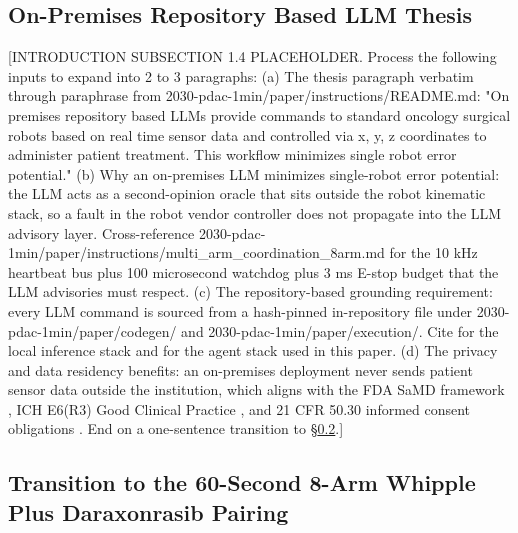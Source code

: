 \subsection{On-Premises Repository Based LLM Thesis}
\label{sec:intro-thesis}

[INTRODUCTION SUBSECTION 1.4 PLACEHOLDER. Process the following inputs to expand into 2 to 3 paragraphs:
(a) The thesis paragraph verbatim through paraphrase from 2030-pdac-1min/paper/instructions/README.md: "On premises repository based LLMs provide commands to standard oncology surgical robots based on real time sensor data and controlled via x, y, z coordinates to administer patient treatment. This workflow minimizes single robot error potential."
(b) Why an on-premises LLM minimizes single-robot error potential: the LLM acts as a second-opinion oracle that sits outside the robot kinematic stack, so a fault in the robot vendor controller does not propagate into the LLM advisory layer. Cross-reference 2030-pdac-1min/paper/instructions/multi_arm_coordination_8arm.md for the 10 kHz heartbeat bus plus 100 microsecond watchdog plus 3 ms E-stop budget that the LLM advisories must respect.
(c) The repository-based grounding requirement: every LLM command is sourced from a hash-pinned in-repository file under 2030-pdac-1min/paper/codegen/ and 2030-pdac-1min/paper/execution/. Cite \cite{ollama, vllm} for the local inference stack and \cite{claude-code, claude-opus-47, claude-sonnet-46} for the agent stack used in this paper.
(d) The privacy and data residency benefits: an on-premises deployment never sends patient sensor data outside the institution, which aligns with the FDA SaMD framework \cite{fda-samd}, ICH E6(R3) Good Clinical Practice \cite{ich-e6r3}, and 21 CFR 50.30 informed consent obligations \cite{cfr-21-50-30}.
End on a one-sentence transition to \S \ref{sec:intro-transition}.]

\subsection{Transition to the 60-Second 8-Arm Whipple Plus Daraxonrasib Pairing}
\label{sec:intro-transition}

